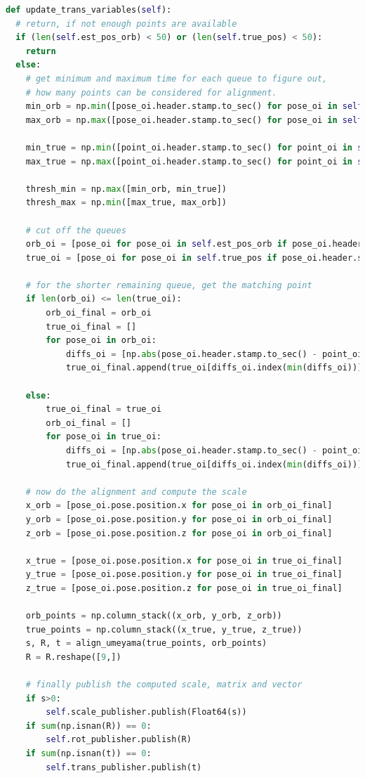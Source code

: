 \begin{lstlisting}[language=python, caption=Main part of the scale estimation node, label=lst:scaleup]
def update_trans_variables(self):
  # return, if not enough points are available
  if (len(self.est_pos_orb) < 50) or (len(self.true_pos) < 50):
	return  
  else:
    # get minimum and maximum time for each queue to figure out, 
    # how many points can be considered for alignment.
    min_orb = np.min([pose_oi.header.stamp.to_sec() for pose_oi in self.est_pos_orb])
	max_orb = np.max([pose_oi.header.stamp.to_sec() for pose_oi in self.est_pos_orb])

    min_true = np.min([point_oi.header.stamp.to_sec() for point_oi in self.true_pos])
	max_true = np.max([point_oi.header.stamp.to_sec() for point_oi in self.true_pos])

    thresh_min = np.max([min_orb, min_true])
    thresh_max = np.min([max_true, max_orb])

    # cut off the queues
    orb_oi = [pose_oi for pose_oi in self.est_pos_orb if pose_oi.header.stamp.to_sec() > thresh_min]
    true_oi = [pose_oi for pose_oi in self.true_pos if pose_oi.header.stamp.to_sec() > thresh_min]

    # for the shorter remaining queue, get the matching point
    if len(orb_oi) <= len(true_oi): 
	    orb_oi_final = orb_oi
	    true_oi_final = []
        for pose_oi in orb_oi: 
            diffs_oi = [np.abs(pose_oi.header.stamp.to_sec() - point_oi.header.stamp.to_sec()) for point_oi in true_oi]
            true_oi_final.append(true_oi[diffs_oi.index(min(diffs_oi))])

	else:
		true_oi_final = true_oi
		orb_oi_final = []
		for pose_oi in true_oi: 
			diffs_oi = [np.abs(pose_oi.header.stamp.to_sec() - point_oi.header.stamp.to_sec()) for point_oi in orb_oi]
			true_oi_final.append(true_oi[diffs_oi.index(min(diffs_oi))])

	# now do the alignment and compute the scale
	x_orb = [pose_oi.pose.position.x for pose_oi in orb_oi_final]
	y_orb = [pose_oi.pose.position.y for pose_oi in orb_oi_final]
	z_orb = [pose_oi.pose.position.z for pose_oi in orb_oi_final]

	x_true = [pose_oi.pose.position.x for pose_oi in true_oi_final]
	y_true = [pose_oi.pose.position.y for pose_oi in true_oi_final]
	z_true = [pose_oi.pose.position.z for pose_oi in true_oi_final]
		
	orb_points = np.column_stack((x_orb, y_orb, z_orb))
	true_points = np.column_stack((x_true, y_true, z_true))
	s, R, t = align_umeyama(true_points, orb_points)
	R = R.reshape([9,])

	# finally publish the computed scale, matrix and vector
	if s>0:
		self.scale_publisher.publish(Float64(s))
	if sum(np.isnan(R)) == 0:
		self.rot_publisher.publish(R)
	if sum(np.isnan(t)) == 0:
		self.trans_publisher.publish(t)
\end{lstlisting}
	
